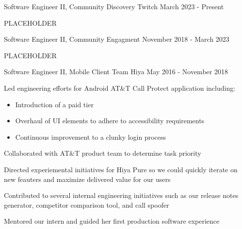 

\begin{cventries}


  \cventry
    {Software Engineer II, Community Discovery} %
    {Twitch} %
    {} %
    {March 2023 - Present} %
    {
    \begin{cvitems} %
    \item PLACEHOLDER
    \end{cvitems}
    }

  \cventry
    {Software Engineer II, Community Engagment} %
    {} %
    {} %
    {November 2018 - March 2023} %
    {
    \begin{cvitems} %
    \item PLACEHOLDER
    \end{cvitems}
    }

 \cventry
    {Software Engineer II, Mobile Client Team} %
    {Hiya} %
    {} %
    {May 2016 - November 2018} %
    {
    \begin{cvitems} %
    \item { Led engineering efforts for Android AT\&T Call Protect application including:
        \begin{itemize}
            \item Introduction of a paid tier
            \item Overhaul of UI elements to adhere to accessibility requirements
            \item Continuous improvement to a clunky login process
        \end{itemize}}
    \item Collaborated with AT\&T product team to determine task priority
    \item Directed experiemental initiatives for Hiya Pure so we could quickly iterate on new feauters and maximize delivered value for our users
    \item Contributed to several internal engineering initiatives such as our release notes generator, competitor comparison tool, and call spoofer
    \item Mentored our intern and guided her first production software experience
    \end{cvitems}
    }


\end{cventries}
